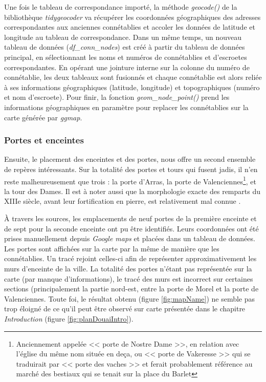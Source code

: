 Une fois le tableau de correspondance importé, la méthode \textit{geocode()} de la bibliothèque \textit{tidygeocoder} va récupérer les coordonnées géographiques des adresses correspondantes aux anciennes connétablies et accoler les données de latitude et longitude  au tableau de correspondance.
Dans un même temps, un nouveau tableau de données (\textit{df\_conn\_nodes}) est créé à partir du tableau de données principal, en sélectionnant les noms et numéros de connétablies et d'escroetes correspondantes. En opérant une jointure interne sur la colonne du numéro de connétablie, les deux tableaux sont fusionnés et chaque connétablie est alors reliée à ses informations géographiques (latitude, longitude) et topographiques (numéro et nom d'escroete). Pour finir, la fonction \textit{geom\_node\_point()} prend les informations géographiques en paramètre pour replacer les connétablies sur la carte générée par \textit{ggmap}. 


\subsubsection{Portes et enceintes}
Ensuite,  le placement des enceintes et  des portes,  nous offre un second ensemble de repères intéressants. Sur la totalité des portes et tours qui fusent jadis, il n'en reste malheureusement que trois :  la porte d'Arras, la porte de Valenciennes\footnote{Anciennement appelée << porte de Nostre Dame >>, en relation avec l'église du même nom située en deça, ou  << porte de Vakeresse >> qui se traduirait par << porte des vaches >>\parencite{demolon_service_1999} et ferait probablement référence au marché des bestiaux qui se tenait sur la place du Barlet}, et la tour des Dames.  Il est à noter aussi que la morphologie exacte des remparts du XIIIe siècle, avant leur fortification en pierre, est relativement mal connue \parencite{demolon_douai_1990}. 

À travers les sources,  les emplacements de neuf portes de la première enceinte et de sept pour la seconde  enceinte ont pu être identifiés. 
Leurs coordonnées  ont été prises manuellement depuis \textit{Google maps} et placées dans un tableau de données. Les portes  sont affichées sur la carte par la même de manière que les connétablies. Un tracé rejoint celles-ci afin de représenter approximativement les murs d'enceinte de la ville. La totalité des portes n'étant pas représentée sur la carte (par manque d'informations), le tracé  des murs est incorrect sur certaines sections (principalement  la partie nord-est, entre la porte de Morel et  la porte de Valenciennes.
Toute foi, le résultat obtenu (figure \ref{fig:mapName}) ne semble pas trop éloigné de ce qu'il peut être observé sur carte présentée dans le chapitre \textit{Introduction} (figure \ref{fig:planDouaiIntro}).

